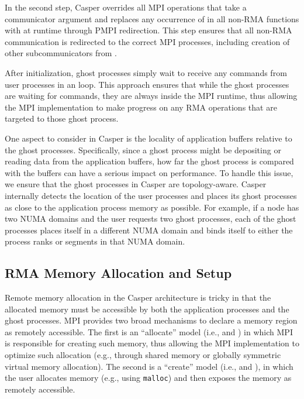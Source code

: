 In the second step, Casper overrides all MPI operations that take a
communicator argument and replaces any occurrence of
 in all non-RMA functions with
 at runtime through PMPI redirection.  This
step ensures that all non-RMA communication is redirected to the
correct MPI processes, including creation of other subcommunicators
from .

After initialization, ghost processes simply wait to receive any
commands from user processes in an  loop.  This approach ensures
that while the ghost processes are waiting for commands, they are
always inside the MPI runtime, thus allowing the MPI implementation to
make progress on any RMA operations that are targeted to those ghost
process.

One aspect to consider in Casper is the locality of application
buffers relative to the ghost processes.  Specifically, since a ghost
process might be depositing or reading data from the application
buffers, how far the ghost process is compared with the buffers can have
a serious impact on performance.  To handle this issue, we ensure that
the ghost processes in Casper are topology-aware.  Casper internally
detects the location of the user processes and places its ghost
processes as close to the application process memory as possible.  For
example, if a node has two NUMA domains and the user requests two
ghost processes, each of the ghost processes places itself in a
different NUMA domain and binds itself to either the process ranks or
segments in that NUMA domain.


\subsection{RMA Memory Allocation and Setup}\label{sec:des-init}

Remote memory allocation in the Casper architecture is tricky in that
the allocated memory must be accessible by both the application
processes and the ghost processes.  MPI provides two broad
mechanisms to declare a memory region as remotely accessible.  The
first is an ``allocate'' model (i.e.,  and
) in which MPI is responsible for creating
such memory, thus allowing the MPI implementation to optimize such
allocation (e.g., through shared memory or globally symmetric virtual
memory allocation).  The second is a ``create'' model (i.e.,
 and ), in which
the user allocates memory (e.g., using \texttt{malloc}) and then
exposes the memory as remotely accessible.

